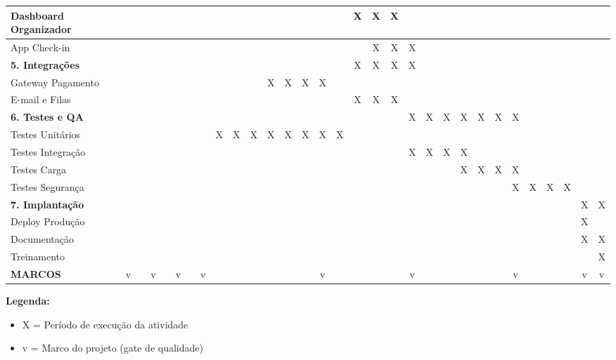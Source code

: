 \begin{table}[H]
{\begin{tabular}{|p{3.5cm}|*{30}{c|}}
Dashboard Organizador &  &  &  &  &  &  &  &  &  &  &  &  &  &  &  & X & X & X &  &  &  &  &  &  &  &  &  &  &  &  \\ \hline
App Check-in &  &  &  &  &  &  &  &  &  &  &  &  &  &  &  &  & X & X & X &  &  &  &  &  &  &  &  &  &  &  \\ \hline
\textbf{5. Integrações} &  &  &  &  &  &  &  &  &  &  &  &  &  &  &  & X & X & X & X &  &  &  &  &  &  &  &  &  &  &  \\ \hline
Gateway Pagamento &  &  &  &  &  &  &  &  &  &  & X & X & X & X &  &  &  &  &  &  &  &  &  &  &  &  &  &  &  &  \\ \hline
E-mail e Filas &  &  &  &  &  &  &  &  &  &  &  &  &  &  &  & X & X & X &  &  &  &  &  &  &  &  &  &  &  &  \\ \hline
\textbf{6. Testes e QA} &  &  &  &  &  &  &  &  &  &  &  &  &  &  &  &  &  &  & X & X & X & X & X & X & X &  &  &  &  &  \\ \hline
Testes Unitários &  &  &  &  &  &  &  & X & X & X & X & X & X & X & X &  &  &  &  &  &  &  &  &  &  &  &  &  &  &  \\ \hline
Testes Integração &  &  &  &  &  &  &  &  &  &  &  &  &  &  &  &  &  &  & X & X & X & X &  &  &  &  &  &  &  &  \\ \hline
Testes Carga &  &  &  &  &  &  &  &  &  &  &  &  &  &  &  &  &  &  &  &  &  & X & X & X & X &  &  &  &  &  \\ \hline
Testes Segurança &  &  &  &  &  &  &  &  &  &  &  &  &  &  &  &  &  &  &  &  &  &  &  &  & X & X & X & X &  &  \\ \hline
\textbf{7. Implantação} &  &  &  &  &  &  &  &  &  &  &  &  &  &  &  &  &  &  &  &  &  &  &  &  &  &  &  &  & X & X \\ \hline
Deploy Produção &  &  &  &  &  &  &  &  &  &  &  &  &  &  &  &  &  &  &  &  &  &  &  &  &  &  &  &  & X &  \\ \hline
Documentação &  &  &  &  &  &  &  &  &  &  &  &  &  &  &  &  &  &  &  &  &  &  &  &  &  &  &  &  & X & X \\ \hline
Treinamento &  &  &  &  &  &  &  &  &  &  &  &  &  &  &  &  &  &  &  &  &  &  &  &  &  &  &  &  &  & X \\ \hline
\textbf{MARCOS} & v &  & v &  & v &  & v &  &  &  &  &  &  & v &  &  &  &  & v &  &  &  &  &  & v &  &  &  & v & v \\ \hline
\end{tabular}%
}
\end{table}

\textbf{Legenda:}
\begin{itemize}
    \item X = Período de execução da atividade
    \item v = Marco do projeto (gate de qualidade)
\end{itemize}

